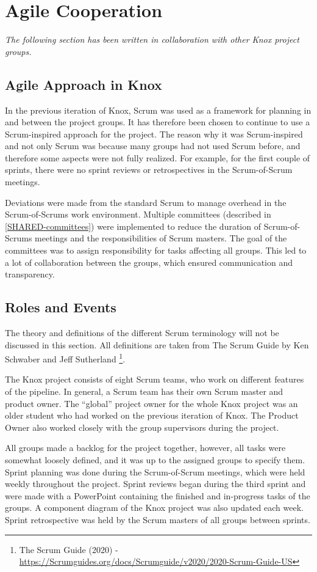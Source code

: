 \section{Agile Cooperation}\label{knox_collaboration}
\textit{The following section has been written in collaboration with other Knox project groups.}


\subsection{Agile Approach in Knox}\label{common_agile_methods}
In the previous iteration of Knox, Scrum was used as a framework for planning in and between the project groups. It has therefore been chosen to continue to use a Scrum-inspired approach for the project. The reason why it was Scrum-inspired and not only Scrum was because many groups had not used Scrum before, and therefore some aspects were not fully realized. For example, for the first couple of sprints, there were no sprint reviews or retrospectives in the Scrum-of-Scrum meetings.  

Deviations were made from the standard Scrum to manage overhead in the Scrum-of-Scrums work environment. Multiple committees (described in \autoref{SHARED-committees}) were implemented to reduce the duration of Scrum-of-Scrums meetings and the responsibilities of Scrum masters. The goal of the committees was to assign responsibility for tasks affecting all groups.
This led to a lot of collaboration between the groups, which ensured communication and transparency. 

\subsection{Roles and Events}\label{roles_and_events}
The theory and definitions of the different Scrum terminology will not be discussed in this section. All definitions are taken from The Scrum Guide by Ken Schwaber and Jeff Sutherland
\footnote{The Scrum Guide (2020) - \url{https://Scrumguides.org/docs/Scrumguide/v2020/2020-Scrum-Guide-US}}.


The Knox project consists of eight Scrum teams, who work on different features of the pipeline. In general, a Scrum team has their own Scrum master and product owner. The “global” project owner for the whole Knox project was an older student who had worked on the previous iteration of Knox. The Product Owner also worked closely with the group supervisors during the project.

All groups made a backlog for the project together, however, all tasks were somewhat loosely defined, and it was up to the assigned groups to specify them. Sprint planning was done during the Scrum-of-Scrum meetings, which were held weekly throughout the project. Sprint reviews began during the third sprint and were made with a PowerPoint containing the finished and in-progress tasks of the groups. A component diagram of the Knox project was also updated each week. Sprint retrospective was held by the Scrum masters of all groups between sprints.

